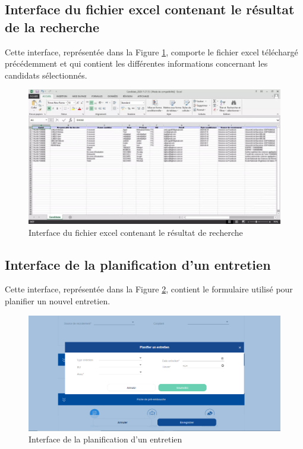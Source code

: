  \subsection{Interface du fichier excel contenant le résultat de la recherche}
 Cette interface, représentée dans la Figure \ref{fig:capture_fichier_excel}, comporte le fichier excel téléchargé précédemment et qui contient les différentes informations concernant les candidats sélectionnés.  
 \begin{figure}[H]
     \centering
     \includegraphics[scale=0.45,width=\textwidth]{img/WhatsApp Image 2020-08-27 at 17.09.20.jpeg}
     \caption{Interface du fichier excel contenant le résultat de recherche}
     \label{fig:capture_fichier_excel}
 \end{figure}
 \subsection{Interface de la planification d'un entretien}
 Cette interface, représentée dans la Figure \ref{fig:capture_planifier_entretien}, contient le formulaire utilisé pour planifier un nouvel entretien.
 \begin{figure}[H]
     \centering
     \includegraphics[scale=0.5]{img/capture planifier entretien.PNG}
     \caption{Interface de la planification d'un entretien}
     \label{fig:capture_planifier_entretien}
 \end{figure}
